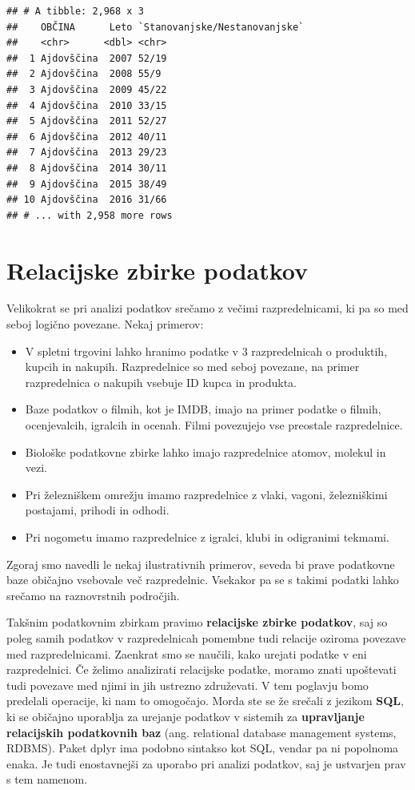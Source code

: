 \documentclass[
]{book}
\providecommand{\tightlist}{%
  \setlength{\itemsep}{0pt}\setlength{\parskip}{0pt}}
\begin{document}
\begin{verbatim}
## # A tibble: 2,968 x 3
##    OBČINA      Leto `Stanovanjske/Nestanovanjske`
##    <chr>      <dbl> <chr>                        
##  1 Ajdovščina  2007 52/19                        
##  2 Ajdovščina  2008 55/9                         
##  3 Ajdovščina  2009 45/22                        
##  4 Ajdovščina  2010 33/15                        
##  5 Ajdovščina  2011 52/27                        
##  6 Ajdovščina  2012 40/11                        
##  7 Ajdovščina  2013 29/23                        
##  8 Ajdovščina  2014 30/11                        
##  9 Ajdovščina  2015 38/49                        
## 10 Ajdovščina  2016 31/66                        
## # ... with 2,958 more rows
\end{verbatim}

\hypertarget{relacijske-zbirke-podatkov}{%
\section{Relacijske zbirke podatkov}\label{relacijske-zbirke-podatkov}}

Velikokrat se pri analizi podatkov srečamo z večimi razpredelnicami, ki pa so med seboj logično povezane. Nekaj primerov:

\begin{itemize}
\tightlist
\item
  V spletni trgovini lahko hranimo podatke v 3 razpredelnicah o produktih, kupcih in nakupih. Razpredelnice so med seboj povezane, na primer razpredelnica o nakupih vsebuje ID kupca in produkta.
\item
  Baze podatkov o filmih, kot je IMDB, imajo na primer podatke o filmih, ocenjevalcih, igralcih in ocenah. Filmi povezujejo vse preostale razpredelnice.
\item
  Biološke podatkovne zbirke lahko imajo razpredelnice atomov, molekul in vezi.
\item
  Pri železniškem omrežju imamo razpredelnice z vlaki, vagoni, železniškimi postajami, prihodi in odhodi.
\item
  Pri nogometu imamo razpredelnice z igralci, klubi in odigranimi tekmami.
\end{itemize}

Zgoraj smo navedli le nekaj ilustrativnih primerov, seveda bi prave podatkovne baze običajno vsebovale več razpredelnic. Vsekakor pa se s takimi podatki lahko srečamo na raznovrstnih področjih.

Takšnim podatkovnim zbirkam pravimo \textbf{relacijske zbirke podatkov}, saj so poleg samih podatkov v razpredelnicah pomembne tudi relacije oziroma povezave med razpredelnicami. Zaenkrat smo se naučili, kako urejati podatke v eni razpredelnici. Če želimo analizirati relacijske podatke, moramo znati upoštevati tudi povezave med njimi in jih ustrezno združevati. V tem poglavju bomo predelali operacije, ki nam to omogočajo. Morda ste se že srečali z jezikom \textbf{SQL}, ki se običajno uporablja za urejanje podatkov v sistemih za \textbf{upravljanje relacijskih podatkovnih baz} (ang. relational database management systems, RDBMS). Paket dplyr ima podobno sintakso kot SQL, vendar pa ni popolnoma enaka. Je tudi enostavnejši za uporabo pri analizi podatkov, saj je ustvarjen prav s tem namenom.
\end{document}
